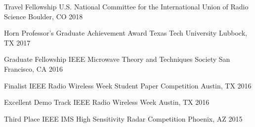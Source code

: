 



\begin{cvhonors}

  \cvhonor
    {Travel Fellowship} %
    {U.S. National Committee for the International Union of Radio Science} %
    {Boulder, CO} %
    {2018} %

  \cvhonor
    {Horn Professor’s Graduate Achievement Award} %
    {Texas Tech University} %
    {Lubbock, TX} %
    {2017} %

  \cvhonor
    {Graduate Fellowship} %
    {IEEE Microwave Theory and Techniques Society} %
    {San Francisco, CA} %
    {2016} %

  \cvhonor
    {Finalist} %
    {IEEE Radio Wireless Week Student Paper Competition} %
    {Austin, TX} %
    {2016} %

  \cvhonor
    {Excellent Demo Track} %
    {IEEE Radio Wireless Week} %
    {Austin, TX} %
    {2016} %
    
  \cvhonor
    {Third Place} %
    {IEEE IMS High Sensitivity Radar Competition} %
    {Phoenix, AZ} %
    {2015} %

\end{cvhonors}

